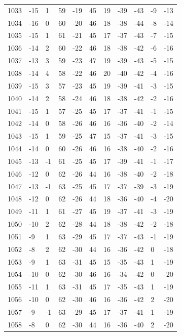 \begin{table}[H]
\begin{tabular}{lllllllllll}
1033 & -15 & 1 & 59 & -19 & 45 & 19 & -39 & -43 & -9 & -13 \\
1034 & -16 & 0 & 60 & -20 & 46 & 18 & -38 & -44 & -8 & -14 \\
1035 & -15 & 1 & 61 & -21 & 45 & 17 & -37 & -43 & -7 & -15 \\
1036 & -14 & 2 & 60 & -22 & 46 & 18 & -38 & -42 & -6 & -16 \\
1037 & -13 & 3 & 59 & -23 & 47 & 19 & -39 & -43 & -5 & -15 \\
1038 & -14 & 4 & 58 & -22 & 46 & 20 & -40 & -42 & -4 & -16 \\
1039 & -15 & 3 & 57 & -23 & 45 & 19 & -39 & -41 & -3 & -15 \\
1040 & -14 & 2 & 58 & -24 & 46 & 18 & -38 & -42 & -2 & -16 \\
1041 & -15 & 1 & 57 & -25 & 45 & 17 & -37 & -41 & -1 & -15 \\
1042 & -14 & 0 & 58 & -26 & 46 & 16 & -36 & -40 & -2 & -14 \\
1043 & -15 & 1 & 59 & -25 & 47 & 15 & -37 & -41 & -3 & -15 \\
1044 & -14 & 0 & 60 & -26 & 46 & 16 & -38 & -40 & -2 & -16 \\
1045 & -13 & -1 & 61 & -25 & 45 & 17 & -39 & -41 & -1 & -17 \\
1046 & -12 & 0 & 62 & -26 & 44 & 16 & -38 & -40 & -2 & -18 \\
1047 & -13 & -1 & 63 & -25 & 45 & 17 & -37 & -39 & -3 & -19 \\
1048 & -12 & 0 & 62 & -26 & 44 & 18 & -36 & -40 & -4 & -20 \\
1049 & -11 & 1 & 61 & -27 & 45 & 19 & -37 & -41 & -3 & -19 \\
1050 & -10 & 2 & 62 & -28 & 44 & 18 & -38 & -42 & -2 & -18 \\
1051 & -9 & 1 & 63 & -29 & 45 & 17 & -37 & -43 & -1 & -19 \\
1052 & -8 & 2 & 62 & -30 & 44 & 16 & -36 & -42 & 0 & -18 \\
1053 & -9 & 1 & 63 & -31 & 45 & 15 & -35 & -43 & 1 & -19 \\
1054 & -10 & 0 & 62 & -30 & 46 & 16 & -34 & -42 & 0 & -20 \\
1055 & -11 & 1 & 63 & -31 & 45 & 17 & -35 & -43 & 1 & -19 \\
1056 & -10 & 0 & 62 & -30 & 46 & 16 & -36 & -42 & 2 & -20 \\
1057 & -9 & -1 & 63 & -29 & 45 & 17 & -37 & -41 & 1 & -19 \\
1058 & -8 & 0 & 62 & -30 & 44 & 16 & -36 & -40 & 2 & -20 \\

\end{tabular}
\end{table}
